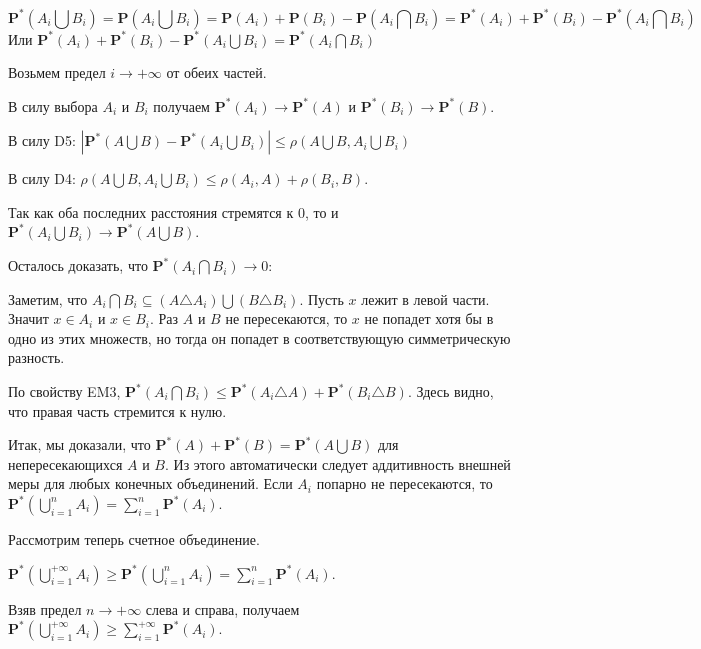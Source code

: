 {$$
\mathbf{P^{*}}(A_{i} \bigcup B_{i})=\mathbf{P}(A_{i} \bigcup
B_{i})=\mathbf{P}(A_{i})+\mathbf{P}(B_{i})-\mathbf{P}(A_{i}
\bigcap
B_{i})=\mathbf{P^{*}}(A_{i})+\mathbf{P^{*}}(B_{i})-\mathbf{P^{*}}(A_{i}
\bigcap B_{i})
$$
Или
$\mathbf{P^{*}}(A_{i})+\mathbf{P^{*}}(B_{i})-\mathbf{P^{*}}(A_{i}
\bigcup B_{i})=\mathbf{P^{*}}(A_{i} \bigcap B_{i})$

Возьмем предел $i\rightarrow +\infty$ от обеих частей.

В силу выбора $A_{i}$ и $B_{i}$ получаем
$\mathbf{P^{*}}(A_{i})\rightarrow \mathbf{P^{*}}(A)$ и
$\mathbf{P^{*}}(B_{i})\rightarrow \mathbf{P^{*}}(B)$.

В силу D5: $|\mathbf{P^{*}}(A \bigcup B)-\mathbf{P^{*}}(A_{i}
\bigcup B_{i})|\leq \rho(A\bigcup B,A_{i}\bigcup B_{i})$

В силу D4: $\rho(A\bigcup B,A_{i}\bigcup B_{i})\leq
\rho(A_{i},A)+\rho(B_{i},B)$.

Так как оба последних расстояния стремятся к $0$, то и
$\mathbf{P^{*}}(A_{i} \bigcup B_{i})\rightarrow
\mathbf{P^{*}}(A\bigcup B)$.

Осталось доказать, что $\mathbf{P^{*}}(A_{i} \bigcap
B_{i})\rightarrow 0$:

Заметим, что $A_{i}\bigcap B_{i} \subseteq (A\triangle
A_{i})\bigcup (B\triangle B_{i})$. Пусть $x$ лежит в левой части.
Значит $x \in A_{i}$ и $x \in B_{i}$. Раз $A$ и $B$ не
пересекаются, то $x$ не попадет хотя бы в одно из этих множеств,
но тогда он попадет в соответствующую симметрическую разность.

По свойству EM3, $\mathbf{P^{*}}(A_{i} \bigcap B_{i})\leq
\mathbf{P^{*}}(A_{i} \triangle A) + \mathbf{P^{*}}(B_{i} \triangle
B)$. Здесь видно, что правая часть стремится к нулю.

Итак, мы доказали, что
$\mathbf{P^{*}}(A)+\mathbf{P^{*}}(B)=\mathbf{P^{*}}(A \bigcup B)$
для непересекающихся $A$ и $B$. Из этого автоматически следует
аддитивность внешней меры для любых конечных объединений. Если
$A_{i}$ попарно не пересекаются, то
$\mathbf{P^{*}}(\bigcup_{i=1}^{n} A_{i})=\sum_{i=1}^{n}
\mathbf{P^{*}}(A_{i})$.

Рассмотрим теперь счетное объединение.

$\mathbf{P^{*}}(\bigcup_{i=1}^{+\infty} A_{i})\geq
\mathbf{P^{*}}(\bigcup_{i=1}^{n}
A_{i})=\sum_{i=1}^{n}\mathbf{P^{*}}(A_{i})$.

Взяв предел $n\rightarrow +\infty$ слева и справа, получаем
$\mathbf{P^{*}}(\bigcup_{i=1}^{+\infty} A_{i})\geq
\sum_{i=1}^{+\infty}\mathbf{P^{*}}(A_{i})$.

}
